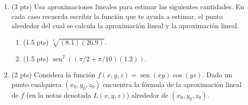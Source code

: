 \documentclass[12pt]{article}
\newcommand{\sen}{\operatorname{sen}}
\begin{document}
\bigskip

            
\bigskip
\bigskip
\bigskip


\begin{enumerate}


  

  
\item (3 pts) Usa aproximaciones lineales para estimar las siguientes cantidades. En cada caso
  recuerda escribir la funci\'on que te ayuda  a estimar, el punto alrededor del cual
  se calcula la aproximaci\'on lineal y la aproximaci\'on lineal.

  \begin{enumerate}
  \item(1.5 pts) $\sqrt[3]{(8.1)(26.9)}$.
    \item (1.5 pts) $\sen^2((\pi/2+\pi/10)(1.2))$.
  \end{enumerate}



  \vspace{4cm}

\item (2 pts) Considera la funci\'on $f(x,y,z)=\sen(xy)\cos(yz)$. Dado un punto cualquiera
  $(x_0,y_0,z_0)$ encuentra la f\'ormula de la aproximaci\'on lineal de $f$ (en la notas
  denotada $L(x,y,z)$) alrededor de $(x_0,y_0,z_0)$.
  
  \end{enumerate}


  
\end{document}
